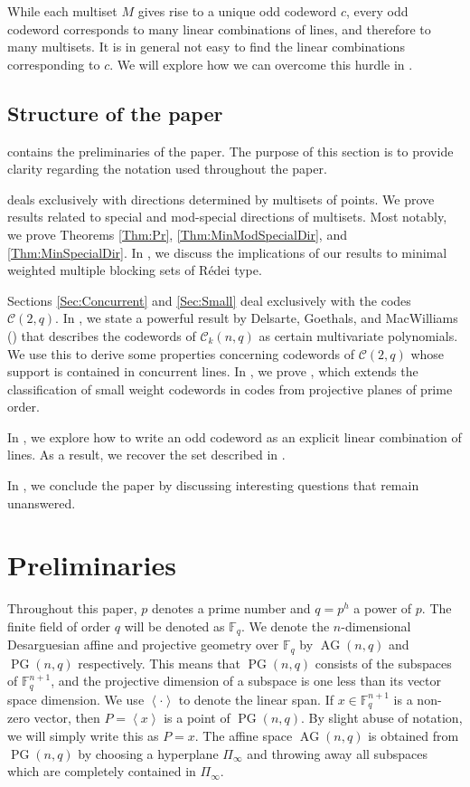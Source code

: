 \documentclass[12pt, a4paper]{article}
\theoremstyle{definition}
\newcommand{\FF}{\mathbb F}
\newcommand{\vspan}[1]{\left \langle #1 \right \rangle}
\newcommand{\mc}{\mathcal C}
\DeclareMathOperator{\PG}{PG}
\newcommand{\pg}{\PG}
\DeclareMathOperator{\AG}{AG}
\newcommand{\ag}{\AG}
\begin{document}
While each multiset $M$ gives rise to a unique odd codeword $c$, every odd codeword corresponds to many linear combinations of lines, and therefore to many multisets.
It is in general not easy to find the linear combinations corresponding to $c$.
We will explore how we can overcome this hurdle in .

\subsection{Structure of the paper}

 contains the preliminaries of the paper.
The purpose of this section is to provide clarity regarding the notation used throughout the paper.

 deals exclusively with directions determined by multisets of points.
We prove results related to special and mod-special directions of multisets.
Most notably, we prove Theorems \ref{Thm:Pr}, \ref{Thm:MinModSpecialDir}, and \ref{Thm:MinSpecialDir}.
In , we discuss the implications of our results to minimal weighted multiple blocking sets of R\'edei type.


Sections \ref{Sec:Concurrent} and \ref{Sec:Small} deal exclusively with the codes $\mc(2,q)$.
In , we state a powerful result by Delsarte, Goethals, and MacWilliams () that describes the codewords of $\mc_k(n,q)$ as certain multivariate polynomials.
We use this to derive some properties concerning codewords of $\mc(2,q)$ whose support is contained in concurrent lines.
In , we prove , which extends the classification of small weight codewords in codes from projective planes of prime order.

In , we explore how to write an odd codeword as an explicit linear combination of lines.
As a result, we recover the set described in .

In , we conclude the paper by discussing interesting questions that remain unanswered.

\section{Preliminaries}
 \label{Sec:Preliminaries}

 Throughout this paper, $p$ denotes a prime number and $q = p^h$ a power of $p$.
 The finite field of order $q$ will be denoted as $\FF_q$.
 We denote the $n$-dimensional Desarguesian affine and projective geometry over $\FF_q$ by $\ag(n,q)$ and $\pg(n,q)$ respectively.
 This means that $\pg(n,q)$ consists of the subspaces of $\FF_q^{n+1}$, and the projective dimension of a subspace is one less than its vector space dimension.
 We use $\vspan{\cdot}$ to denote the linear span.
 If $x \in \FF_q^{n+1}$ is a non-zero vector, then $P = \vspan x$ is a point of $\pg(n,q)$.
 By slight abuse of notation, we will simply write this as $P = x$.
 The affine space $\ag(n,q)$ is obtained from $\pg(n,q)$ by choosing a hyperplane $\Pi_\infty$ and throwing away all subspaces which are completely contained in $\Pi_\infty$.
\end{document}
